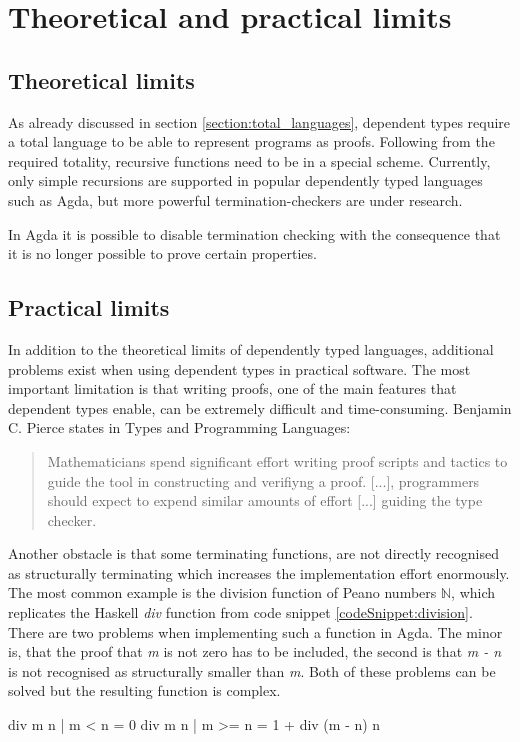 \section{Theoretical and practical limits}\label{section:limits}
\subsection{Theoretical limits}
As already discussed in section \ref{section:total_languages}, dependent types require a total language to be able to represent programs as proofs.
Following from the required totality, recursive functions need to be in a special scheme.
Currently, only simple recursions are supported in popular dependently typed languages such as Agda, but more powerful termination-checkers are under research.

In Agda it is possible to disable termination checking with the consequence that it is no longer possible to prove certain properties.
\subsection{Practical limits}
In addition to the theoretical limits of dependently typed languages, additional problems exist when using dependent types in practical software.
The most important limitation is that writing proofs, one of the main features that dependent types enable, can be extremely difficult and time-consuming.
Benjamin C. Pierce states in Types and Programming Languages\cite{10.5555/509043}:
\begin{quote}
Mathematicians spend significant effort writing proof scripts and tactics to guide the tool in constructing and verifiyng a proof. [...], programmers should expect to expend similar amounts of effort [...] guiding the type checker. 
\end{quote}

Another obstacle is that some terminating functions, are not directly recognised as structurally terminating which increases the implementation effort enormously.
The most common example is the division function of Peano numbers $\mathbb{N}$, which replicates the Haskell \emph{div} function from code snippet \ref{codeSnippet:division}.
There are two problems when implementing such a function in Agda. The minor is, that the proof that \emph{m} is not zero has to be included, the second is that \emph{m - n} is not recognised as structurally smaller than \emph{m}. Both of these problems can be solved but the resulting function is complex.
\begin{codesnippet}[mathescape=true, caption={Definition of div function in Haskell}, label={codeSnippet:division}]
div m n | m < n = 0
div m n | m >= n = 1 + div (m - n) n
\end{codesnippet}


